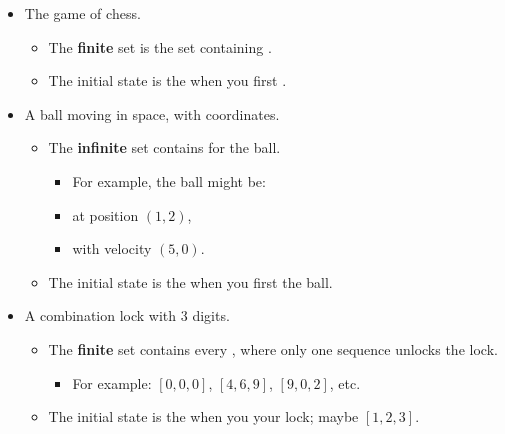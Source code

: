             \begin{itemize}
                \item The game of chess.
                    \begin{itemize}
                        \item The \textbf{finite} set  is the set containing .
                        \item The initial state  is the  when you first .
                    \end{itemize}
                    
                \item A ball moving in space, with coordinates.
                    \begin{itemize}
                        \item The \textbf{infinite} set  contains  for the ball.
                            \begin{itemize}
                                \item For example, the ball might be:
                                \item at position $(1,2)$, 
                                \item with velocity $(5,0)$.
                                
                            \end{itemize}
                        \item The initial state  is the  when you first  the ball.
                    \end{itemize}
                    
                \item A combination lock with 3 digits.
                    \begin{itemize}
                        \item The \textbf{finite} set  contains every , where only one sequence unlocks the lock.
                            \begin{itemize}
                                \item For example: $[0,0,0]$, \; $[4,6,9]$, \; $[9, 0, 2]$, \; etc.
                            \end{itemize}
                        \item The initial state  is the  when you  your lock; maybe $[1,2,3]$.
                    \end{itemize}
            \end{itemize}
    
